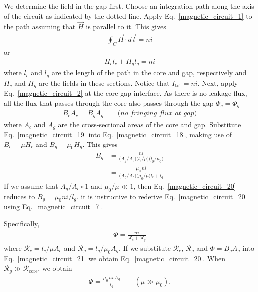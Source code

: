 \documentclass[12pt,a4paper,oneside]{book}
\begin{document}
\begin{onehalfspace}
\begin{example}
	We determine the field in the gap first. Choose an integration path along the axis of the circuit as indicated by the dotted line. Apply Eq.~\eqref{magnetic_circuit_1} to the path assuming that $\vec{H}$ is parallel to it. This gives
	\begin{equation*}\label{}
		{\begin{aligned}
			\oint_{C}\vec{H}\cdot d\vec{l}=ni
		\end{aligned}}
	\end{equation*}
or
	\begin{equation}\label{magnetic_circuit_18}
	{\begin{aligned}
		H_cl_c+H_gl_g=ni
	\end{aligned}}
	\end{equation}
where $l_c$ and $l_g$ are the length of the path in the core and gap, respectively and $H_c$ and $H_g$ are the fields in these sections. Notice that $I_\text{tot} = ni$. Next, apply Eq.~\eqref{magnetic_circuit_2} at the core gap interface. As there is no leakage flux, all the flux that passes through the core also passes through the gap $\Phi_c=\Phi_g$
	\begin{equation}\label{magnetic_circuit_19}
	{\begin{aligned}
			B_cA_c=B_gA_g\qquad\textit{(no fringing flux at gap)}
	\end{aligned}}
	\end{equation}
where $A_c$ and $A_g$ are the cross-sectional areas of the core and gap. Substitute Eq.~\eqref{magnetic_circuit_19} into Eq.~\eqref{magnetic_circuit_18}, making use of $B_c=\mu H_c$ and $B_g=\mu_0 H_g$. This gives
	\begin{equation}\label{magnetic_circuit_20}
	{\begin{aligned}
			B_g &=\frac{ni}{\Big(A_g/A_c\Big)\Big(l_c/\mu\Big)\Big(l_g/\mu_0\Big)} \\[6pt]
			&=\frac{\mu_0\,ni}{\Big(A_g/A_c\Big)\Big(\mu_0/\mu\Big)l_c+l_g}
	\end{aligned}}
	\end{equation}
If we assume that $A_g/A_c\circ1$ and $\mu_0/\mu\ll1$, then Eq.~\eqref{magnetic_circuit_20} reduces to $B_g = \mu_0 ni/l_g$. it is instructive to rederive Eq.~\eqref{magnetic_circuit_20} using Eq.~\eqref{magnetic_circuit_7}.

Specifically,
	\begin{equation}\label{magnetic_circuit_21}
	{\begin{aligned}
			\Phi=\frac{ni}{\mathscr{R}_c+\mathscr{R}_g}
	\end{aligned}}
	\end{equation}
where $\mathscr{R}_c=l_c/\mu A_c$ and $\mathscr{R}_g=l_g/\mu_0 A_g$. If we substitute $\mathscr{R}_c$, $\mathscr{R}_g$ and $\Phi=B_gA_g$ into Eq.~\eqref{magnetic_circuit_21} we obtain Eq.~\eqref{magnetic_circuit_20}. When $\mathscr{R}_g\gg\mathscr{R}_\text{core}$, we obtain
	\begin{equation}\label{magnetic_circuit_22}
	{\begin{aligned}
			\Phi=\frac{\mu_0\,ni\,A_g}{l_g}\qquad(\mu\gg\mu_0).
	\end{aligned}}
	\end{equation}


\end{example}
\end{onehalfspace}
\end{document}
